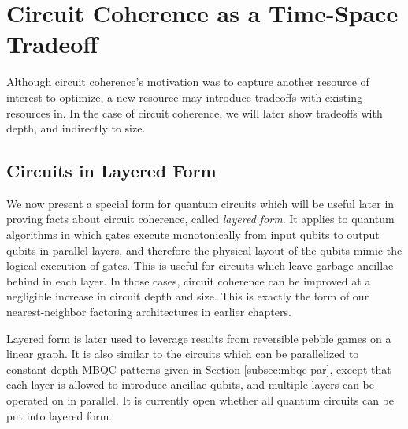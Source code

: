 \section{Circuit Coherence as a Time-Space Tradeoff}
\label{sec:cohere-tradeoff}

Although circuit coherence's motivation was to capture another resource
of interest to optimize, a new resource may introduce tradeoffs with
existing resources in. In the case of circuit coherence, we will later
show tradeoffs with depth, and indirectly to size.



\subsection{Circuits in Layered Form}
\label{subsec:cohere-layer}

We now present a special form for quantum circuits which will be useful
later in proving facts about circuit coherence, called \emph{layered form}.
It applies to quantum algorithms in which gates execute
monotonically from input qubits to output qubits in parallel layers,
and therefore the physical layout of the qubits mimic the logical
execution of gates. This is useful for circuits which leave
garbage ancillae behind in each layer. In those cases,
circuit coherence can be improved at a negligible increase
in circuit depth and size. This is exactly the form of our
nearest-neighbor factoring architectures in earlier chapters.

Layered form is later used to leverage
results from reversible pebble games on a linear graph. It is also
similar to the circuits which can be parallelized to
constant-depth
MBQC patterns given in Section \ref{subsec:mbqc-par}, except that
each layer is allowed to introduce ancillae qubits, and multiple layers
can be operated on in parallel.
It is currently open whether
all quantum circuits can be put into layered form.

